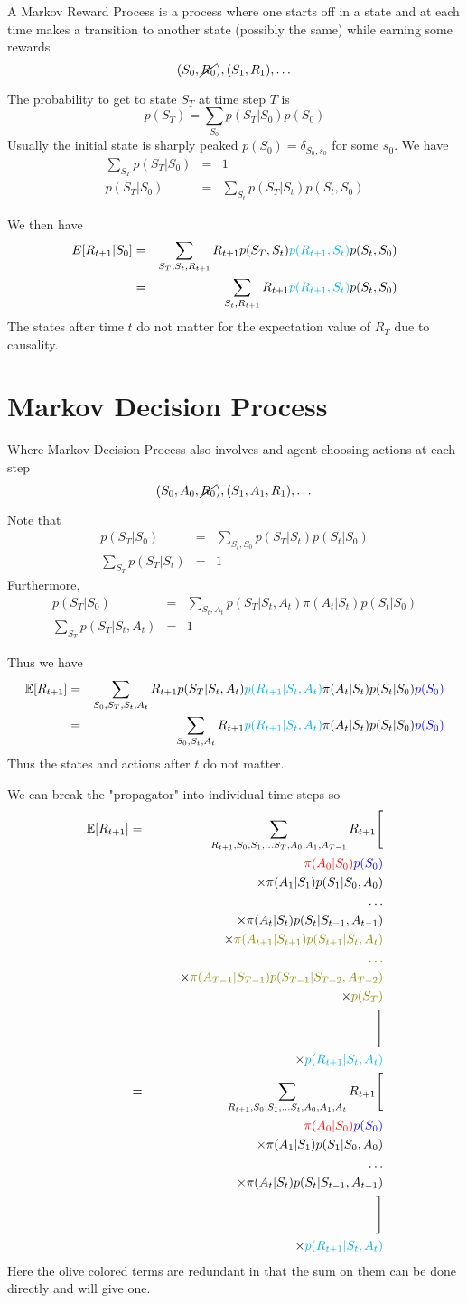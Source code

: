 \documentclass[11pt,a4paper]{article}
\newcommand\be{\begin{equation}}
\newcommand\bea{\begin{eqnarray}}
\newcommand\ee{\end{equation}}
\newcommand\eea{\end{eqnarray}}
\newcommand{\nn}{\nonumber \\}
\begin{document}
A Markov Reward Process is a process where one starts off in a state and at each time makes a transition to another state (possibly the same) while earning some rewards
\be
(S_0,\cancel{R_0}),(S_1,R_1), \dots
\ee

The probability to get to state $S_T$ at time step $T$ is
\be
p(S_T) = \sum_{S_0} p(S_T|S_0)p(S_0)
\ee
Usually the initial state is sharply peaked $p(S_0) = \delta_{S_0,s_0}$ for some $s_0$. We have
\bea
\sum_{S_T} p(S_T|S_0) &=& 1 \\
p(S_T|S_0) &=& \sum_{S_t} p(S_T|S_t)p(S_t,S_0)
\eea

We then have
\bea
E[R_{t+1}|S_0] &=& \sum_{S_T,S_{t},R_{t+1}} R_{t+1} p(S_T,S_{t}) {\color{cyan} p(R_{t+1},S_{t})} p(S_{t},S_0) \nn
&=& \sum_{S_{t},R_{t+1}} R_{t+1} {\color{cyan} p(R_{t+1},S_{t})} p(S_{t},S_0)
\eea
The states after time $t$ do not matter for the expectation value of $R_T$ due to causality.



\section{Markov Decision Process}

Where Markov Decision Process also involves and agent choosing actions at each step
\be
(S_0,A_0,\cancel{R_0}),(S_1,A_1,R_1), \dots
\ee

Note that
\bea
p(S_T|S_0) &=& \sum_{S_t,S_0} p(S_T|S_t) p(S_t|S_0) \\
\sum_{S_T} p(S_T|S_t) &=& 1
\eea
Furthermore,
\bea
p(S_T|S_0) &=& \sum_{S_t,A_t} p(S_T|S_t,A_t) \pi(A_t|S_t) p (S_t|S_0) \\
\sum_{S_T} p(S_T|S_t,A_t) &=& 1
\eea

Thus we have
\bea
\mathbb E[R_{t+1}] &=&  \sum_{S_0,S_T,S_t,A_t} R_{t+1} p(S_T|S_t,A_t) {\color{cyan} p(R_{t+1}|S_t,A_t)} \pi(A_t|S_t) p (S_t|S_0) {\color{blue} p(S_0)} \nn
&=& \sum_{S_0,S_t,A_t} R_{t+1} {\color{cyan} p(R_{t+1}|S_t,A_t)} \pi(A_t|S_t) p (S_t|S_0) {\color{blue} p(S_0)}
\eea
Thus the states and actions after $t$ do not matter.

We can break the "propagator" into individual time steps so
\bea
\mathbb E[ R_{t+1}] &=& \sum_{R_{t+1}, S_0, S_1, \dots S_T, A_0,A_1, A_{T-1}} R_{t+1} \Bigg[ \nn
&& \qquad \color{red}{\pi(A_0|S_0)} \color{blue}{p(S_0)} \nn
&& \qquad \times \pi(A_{1}|S_{1}) p(S_{1}|S_0,A_0) \nn
&& \qquad \qquad \dots \nn
&&  \qquad \times \pi(A_{t}|S_{t}) p(S_{t}|S_{t-1},A_{t-1}) \nn
&& \qquad \times {\color{olive} \pi(A_{t+1}|S_{t+1}) p(S_{t+1}|S_{t},A_{t}) } \nn
&& \qquad \qquad {\color{olive} \dots} \nn
&& \qquad \times {\color{olive} \pi(A_{T-1}|S_{T-1}) p(S_{T-1}|S_{T-2},A_{T-2}) } \nn
&& \qquad \times {\color{olive} p(S_T)} \nn
&& \Bigg]  \nn
&& \times{\color{cyan} p(R_{t+1}| S_{t},A_{t})} \nn
&=& \sum_{R_{t+1}, S_0, S_1, \dots S_t, A_0,A_1, A_{t}} R_{t+1} \Bigg[ \nn
&& \qquad \color{red}{\pi(A_0|S_0)} \color{blue}{p(S_0)} \nn
&& \qquad \times \pi(A_{1}|S_{1}) p(S_{1}|S_0,A_0) \nn
&& \qquad \qquad \dots \nn
&&  \qquad \times \pi(A_{t}|S_{t}) p(S_{t}|S_{t-1},A_{t-1}) \nn
&& \Bigg]  \nn
&& \times{\color{cyan} p(R_{t+1}| S_{t},A_{t})}
\eea
Here the olive colored terms are redundant in that the sum on them can be done directly and will give one. 
\end{document}
